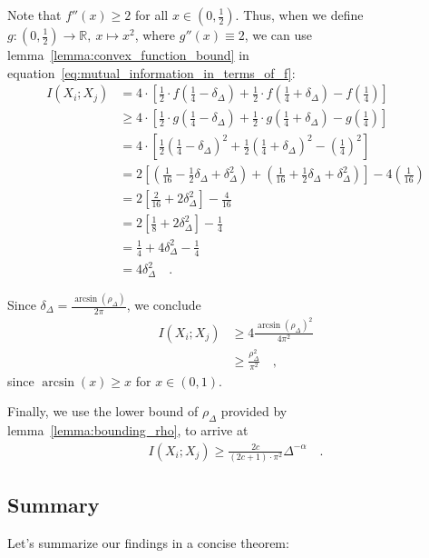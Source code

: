 \documentclass[../../main.tex]{subfiles}
\begin{document}
Note that $f''(x) \geq 2$ for all $x \in (0, \frac{1}{2})$. Thus, when we define $g: (0, \frac{1}{2}) \to \mathbb{R}, \ x \mapsto x^2$, where $g''(x) \equiv 2$, we can use lemma~\ref{lemma:convex_function_bound} in equation~\eqref{eq:mutual_information_in_terms_of_f}:
\begin{align*}
    I(X_i; X_j) &= 4 \cdot \left[ \frac{1}{2} \cdot f(\frac{1}{4} - \delta_\Delta) + \frac{1}{2} \cdot f(\frac{1}{4} + \delta_\Delta) - f(\frac{1}{4}) \right] \\
    &\geq 4 \cdot \left[ \frac{1}{2} \cdot g(\frac{1}{4} - \delta_\Delta) + \frac{1}{2} \cdot g(\frac{1}{4} + \delta_\Delta) - g(\frac{1}{4}) \right] \\
    &= 4 \cdot \left[ \frac{1}{2} \left(\frac{1}{4} - \delta_\Delta\right)^2 + \frac{1}{2} \left(\frac{1}{4} + \delta_\Delta\right)^2 - \left(\frac{1}{4}\right)^2 \right] \\
    &= 2 \left[ \left(\frac{1}{16} - \frac{1}{2}\delta_\Delta + \delta_\Delta^2\right) + \left(\frac{1}{16} + \frac{1}{2}\delta_\Delta + \delta_\Delta^2\right) \right] - 4\left(\frac{1}{16}\right) \\
    &= 2 \left[ \frac{2}{16} + 2\delta_\Delta^2 \right] - \frac{4}{16} \\
    &= 2 \left[ \frac{1}{8} + 2\delta_\Delta^2 \right] - \frac{1}{4} \\
    &= \frac{1}{4} + 4\delta_\Delta^2 - \frac{1}{4} \\
    &= 4\delta_\Delta^2 \quad .
\end{align*}

Since $\delta_\Delta = \frac{\arcsin(\rho_\Delta)}{2\pi}$, we conclude
\begin{align*}
    I(X_i; X_j) &\geq 4 \frac{\arcsin(\rho_\Delta)^2}{4\pi^2} \\
    &\geq \frac{\rho_\Delta^2}{\pi^2} \quad ,
\end{align*}
since $\arcsin(x) \geq x$ for $x \in (0, 1)$.

Finally, we use the lower bound of $\rho_\Delta$ provided by lemma~\ref{lemma:bounding_rho}, to arrive at
\begin{align*}
    I(X_i; X_j) \geq \frac{2c}{(2c + 1) \cdot \pi^2} \Delta^{-\alpha} \quad .
\end{align*}

\pagebreak
\subsection{Summary}
Let's summarize our findings in a concise theorem:
\end{document}
